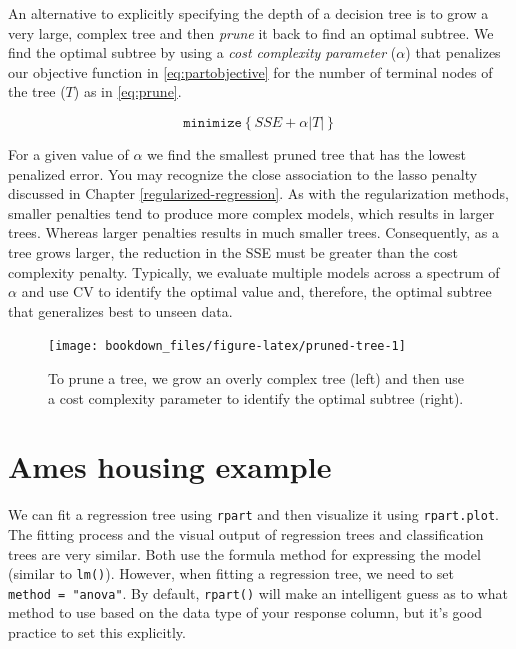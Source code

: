 \documentclass[]{krantz}
\begin{document}
An alternative to explicitly specifying the depth of a decision tree is to grow a very large, complex tree and then \emph{prune} it back to find an optimal subtree. We find the optimal subtree by using a \emph{cost complexity parameter} (\(\alpha\)) that penalizes our objective function in \eqref{eq:partobjective} for the number of terminal nodes of the tree (\(T\)) as in \eqref{eq:prune}.

\begin{equation}
\label{eq:prune}
 \texttt{minimize} \left\{ SSE + \alpha \vert T \vert \right\}
\end{equation}

For a given value of \(\alpha\) we find the smallest pruned tree that has the lowest penalized error. You may recognize the close association to the lasso penalty discussed in Chapter \ref{regularized-regression}. As with the regularization methods, smaller penalties tend to produce more complex models, which results in larger trees. Whereas larger penalties results in much smaller trees. Consequently, as a tree grows larger, the reduction in the SSE must be greater than the cost complexity penalty. Typically, we evaluate multiple models across a spectrum of \(\alpha\) and use CV to identify the optimal value and, therefore, the optimal subtree that generalizes best to unseen data.

\begin{figure}

{\centering \texttt{[image: bookdown\_files/figure-latex/pruned-tree-1]} 

}

\caption{To prune a tree, we grow an overly complex tree (left) and then use a cost complexity parameter to identify the optimal subtree (right).}\label{fig:pruned-tree}
\end{figure}

\hypertarget{ames-housing-example}{%
\section{Ames housing example}\label{ames-housing-example}}

We can fit a regression tree using \texttt{rpart} and then visualize it using \texttt{rpart.plot}. The fitting process and the visual output of regression trees and classification trees are very similar. Both use the formula method for expressing the model (similar to \texttt{lm()}). However, when fitting a regression tree, we need to set \texttt{method\ =\ "anova"}. By default, \texttt{rpart()} will make an intelligent guess as to what method to use based on the data type of your response column, but it's good practice to set this explicitly.
\end{document}
